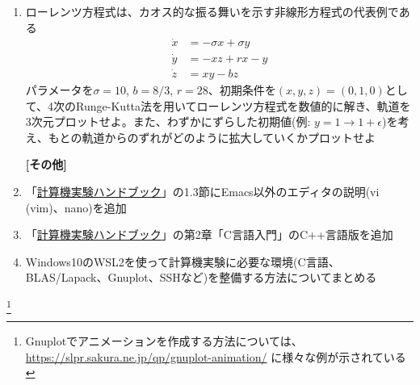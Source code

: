 \documentclass[11pt]{jarticle}
\begin{document}
\begin{enumerate}
\item ローレンツ方程式は、カオス的な振る舞いを示す非線形方程式の代表例である
  \begin{align*}
    \dot{x} &= -\sigma x + \sigma y \\
    \dot{y} &= -xz + rx - y \\
    \dot{z} &= xy - bz
  \end{align*}
  パラメータを$\sigma=10$, $b=8/3$, $r=28$、初期条件を$(x,y,z)=(0,1,0)$として、4次のRunge-Kutta法を用いてローレンツ方程式を数値的に解き、軌道を3次元プロットせよ。また、わずかにずらした初期値(例: $y=1 \rightarrow 1+\epsilon$)を考え、もとの軌道からのずれがどのように拡大していくかプロットせよ
  
\hspace*{-2em} {\bf [その他]}

\item 「\href{https://github.com/utphys-comp/handbook/releases/download/handbook-2019/handbook.pdf}{計算機実験ハンドブック}」の1.3節にEmacs以外のエディタの説明(vi (vim)、nano)を追加

\item 「\href{https://github.com/utphys-comp/handbook/releases/download/handbook-2019/handbook.pdf}{計算機実験ハンドブック}」の第2章「C言語入門」のC++言語版を追加

\item Windows10のWSL2を使って計算機実験に必要な環境(C言語、BLAS/Lapack、Gnuplot、SSHなど)を整備する方法についてまとめる

\end{enumerate}  

\renewcommand{\thefootnote}{\fnsymbol{footnote}}
\footnote[0]{Gnuplotでアニメーションを作成する方法については、 \url{https://slpr.sakura.ne.jp/qp/gnuplot-animation/} に様々な例が示されている}
  
\end{document}
